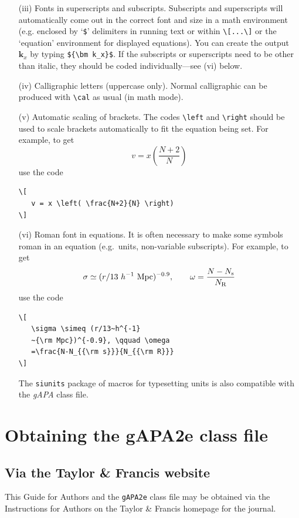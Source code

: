 \documentclass{gAPA2e}
\theoremstyle{plain}
\theoremstyle{remark}
\theoremstyle{definition}
\begin{document}
\begin{enumerate}
\item[(iii)] Fonts in superscripts and subscripts. Subscripts and superscripts will automatically come  out in the correct font
and size in a math environment (e.g. enclosed by `\verb"$"'
delimiters in running text or within \verb"\[...\]" or the
`equation' environment for displayed equations). You can create
the output ${\bm k_x}$ by typing \verb"${\bm k_x}$". If the
subscripts or superscripts need to be other than italic, they
should be coded individually---see (vi) below.

\item[(iv)] Calligraphic letters (uppercase only).
%
%
Normal calligraphic can be produced with \verb"\cal" as usual (in
math mode).

\item[(v)] Automatic scaling of brackets. The codes \verb"\left" and
\verb"\right" should  be used to scale brackets automatically to
fit the equation being set. For example, to get
\[
   v = x \left( \frac{N+2}{N} \right)
\]
use the code
%
\begin{verbatim}
\[
   v = x \left( \frac{N+2}{N} \right)
\]
\end{verbatim}

\item[(vi)] Roman font in equations. It is often necessary to make some
symbols roman in an equation (e.g.\ units, non-variable
subscripts). For example, to get
\[
   \sigma \simeq (r/13~h^{-1}~{\rm Mpc})^{-0.9},
   \qquad \omega = \frac{N-N_{\rm s}}{N_{\rm R}}
\]
\noindent use the code
%
\begin{verbatim}
\[
   \sigma \simeq (r/13~h^{-1}
   ~{\rm Mpc})^{-0.9}, \qquad \omega
   =\frac{N-N_{{\rm s}}}{N_{{\rm R}}}
\]
\end{verbatim}
The \texttt{siunits} package of macros for typesetting units is also compatible with the \textit{gAPA} class file.
\end{enumerate}


\section{Obtaining the gAPA2e class file}\label{FTP}

\subsection{Via the Taylor \& Francis website}

This Guide for Authors and the \verb"gAPA2e" class file may be obtained via the Instructions for Authors
on the Taylor \& Francis homepage for the journal.
\end{document}
